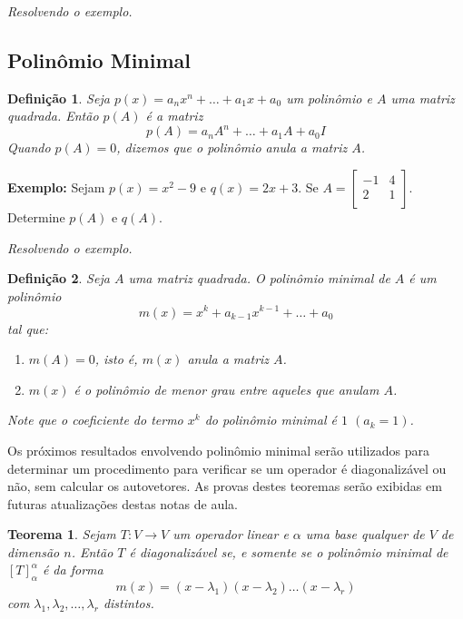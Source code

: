 \documentclass[oneside,a4paper,12pt]{article}
\newtheorem{theorem}{Teorema}[section]
\newtheorem{definition}{Definição}[section]
\begin{document}
\vspace{50pt}
\emph{Resolvendo o exemplo.}

\subsection{Polinômio Minimal}

\begin{definition}
	Seja $p(x) = a_n x^n + \dots + a_1 x + a_0$ um polinômio e $A$ uma matriz quadrada. Então $p(A)$ é a matriz
	$$p(A) = a_n A^n + \dots + a_1 A + a_0 I$$
	Quando $p(A) = 0$, dizemos que o polinômio \emph{anula} a matriz $A$.
\end{definition}

{\bf Exemplo:} Sejam $p(x) = x^2 - 9$ e $q(x) = 2x + 3$. Se $A = \left[
\begin{array}{cc}
-1	&	4 \\
2	&	1 \\
\end{array}
\right]$. Determine $p(A)$ e $q(A)$.

\vspace{50pt}
\emph{Resolvendo o exemplo.}

\begin{definition}
	Seja $A$ uma matriz quadrada. O \emph{polinômio minimal} de $A$ é um polinômio
	$$m(x) = x^k + a_{k-1}x^{k-1} + \dots + a_0$$
	tal que:
	\begin{enumerate}
		\item [i)] $m(A) = 0$, isto é, $m(x)$ anula a matriz $A$.
		\item [ii)] $m(x)$ é o polinômio de menor grau entre aqueles que anulam $A$.
	\end{enumerate}
	Note que o coeficiente do termo $x^k$ do polinômio minimal é $1$ $(a_k = 1)$.

\end{definition}
Os próximos resultados envolvendo polinômio minimal serão utilizados para determinar um procedimento para verificar se um operador é diagonalizável ou não, sem calcular os autovetores. As provas destes teoremas serão exibidas em futuras atualizações destas notas de aula.

\begin{theorem}
	Sejam $T:V \rightarrow V$ um operador linear e $\alpha$ uma base qualquer de $V$ de dimensão $n$. Então $T$ é diagonalizável se, e somente se o polinômio minimal de $[T]_{\alpha}^{\alpha}$ é da forma
	$$m(x) = (x - \lambda_1)(x - \lambda_2) \dots (x - \lambda_r)$$
	com $\lambda_1, \lambda_2,\dots, \lambda_r$ distintos.
\end{theorem}
\end{document}
